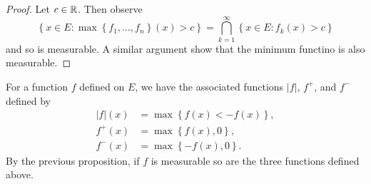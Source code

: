 \begin{proof}
	Let $c \in \mathbb{R}$.
	Then observe
	\[
		\left\{
			x \in E: \max
			\left\{
				f_1, \ldots, f_n
			\right\}
			(x) > c
		\right\}
		=
		\bigcap_{k=1}^\infty
		\left\{
			x \in E:
			f_k(x) > c
		\right\}
	\]
	and so is measurable.
	A similar argument show that the minimum functino is also measurable.
\end{proof}

For a function $f$ defined on $E$, we have the associated functions
$\left\lvert f \right\rvert$, $f^+$, and $f^-$
defined by
\begin{align*}
	\left\lvert f \right\rvert(x)
	&= \max\left\{
		f(x)< -f(x)
	\right\}, \\
	f^+(x)
	&= \max\left\{
		f(x), 0
	\right\}, \\
	f^-(x)
	&= \max\left\{
		-f(x), 0
	\right\}.
\end{align*}
By the previous proposition, if $f$ is measurable so are the three
functions defined above.
